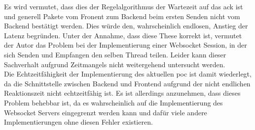 Es wird vermutet, dass dies der Regelalgorithmus der Wartezeit auf das \ac{ack} ist und generell Pakete vom Fronent zum Backend beim ersten Senden nicht vom Backend bestätigt werden.
Dies würde den, wahrscheinlich endlosen, Anstieg der Latenz begründen.
Unter der Annahme, dass diese These korrekt ist, vermutet der Autor das Problem bei der Implementierung einer Websocket Session, in der sich Senden und Empfangen den selben Thread teilen.
Leider kann dieser Sachverhalt aufgrund Zeitmangels nicht weitergehend untersucht werden.
\\Die Echtzeitfähigkeit der Implementierung des aktuellen \ac{poc} ist damit wiederlegt, da die Schnittstelle zwischen Backend und Frontend aufgrund der nicht endlichen Reaktionszeit nicht echtzeitfähig ist.
Es ist allerdings anzunehmen, dass dieses Problem behebbar ist, da es wahrscheinlich auf die Implementierung des Websocket Servers eingegrenzt werden kann und dafür viele andere Implementierungen ohne diesen Fehler existieren.
